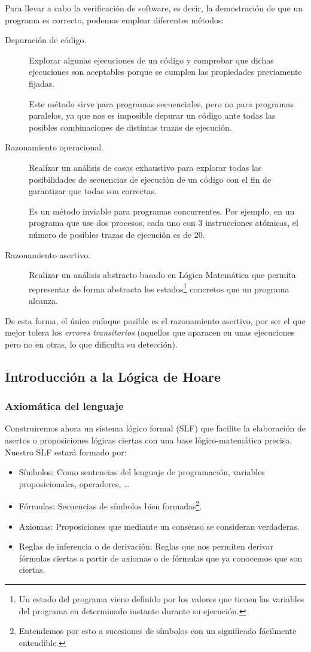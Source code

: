 Para llevar a cabo la verificación de software, es decir, la demostración de que un programa es correcto, podemos emplear diferentes métodos:
\begin{description}
    \item [Depuración de código.] Explorar algunas ejecuciones de un código y comprobar que dichas ejecuciones son aceptables porque se cumplen las propiedades previamente fijadas.

        Este método sirve para programas secuenciales, pero no para programas paralelos, ya que nos es imposible depurar un código ante todas las posibles combinaciones de distintas trazas de ejecución.
    \item [Razonamiento operacional.] Realizar un análisis de casos exhaustivo para explorar todas las posibilidades de secuencias de ejecución de un código con el fin de garantizar que todas son correctas.

        Es un método inviable para programas concurrentes. Por ejemplo, en un programa que use dos procesos, cada uno con 3 instrucciones atómicas, el número de posibles trazas de ejecución es de 20.
    \item [Razonamiento asertivo.] Realizar un análisis abstracto basado en Lógica Matemática que permita representar de forma abstracta los estados\footnote{Un estado del programa viene definido por los valores que tienen las variables del programa en determinado instante durante su ejecución.} concretos que un programa alcanza.
\end{description}
De esta forma, el único enfoque posible es el razonamiento asertivo, por ser el que mejor tolera los \textit{errores transitorios} (aquellos que aparacen en unas ejecuciones pero no en otras, lo que dificulta su detección).

\subsection{Introducción a la Lógica de Hoare}
\subsubsection{Axiomática del lenguaje}
Construiremos ahora un sistema lógico formal (SLF) que facilite la elaboración de asertos o proposiciones lógicas ciertas con una base lógico-matemática precisa.\\

Nuestro SLF estará formado por:
\begin{itemize}
    \item Símbolos: Como sentencias del lenguaje de programación, variables proposicionales, operadores, \ldots
    \item Fórmulas: Secuencias de símbolos bien formadas\footnote{Entendemos por esto a sucesiones de símbolos con un significado fácilmente entendible.}.
    \item Axiomas: Proposiciones que mediante un consenso se consideran verdaderas.
    \item Reglas de inferencia o de derivación: Reglas que nos permiten derivar fórmulas ciertas a partir de axiomas o de fórmulas que ya conocemos que son ciertas.
\end{itemize}

